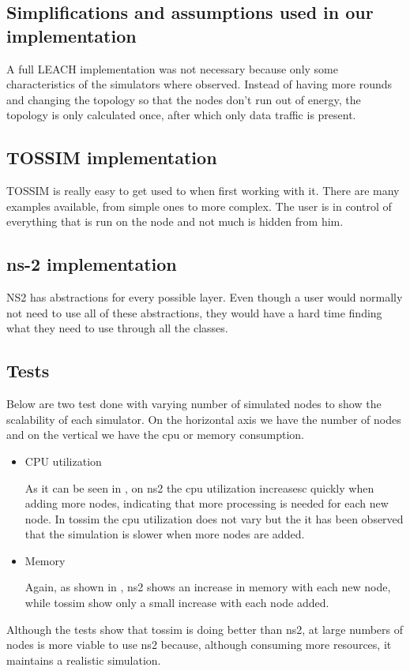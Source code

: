  

\subsection{Simplifications and assumptions used in our implementation}
A full LEACH implementation was not necessary because only some characteristics of
the simulators where observed. Instead of having more rounds and changing the topology
so that the nodes don't run out of energy, the topology is only calculated once, after
which only data traffic is present.
\subsection{TOSSIM implementation}
TOSSIM is really easy to get used to when first working with it. There are many examples
available, from simple ones to more complex. The user is in control of everything that is
run on the node and not much is hidden from him.

\subsection{ns-2 implementation}
NS2 has abstractions for every possible layer. Even though a user would normally not need to use
all of these abstractions, they would have a hard time finding what they need to use through all 
the classes.

\subsection{Tests}
Below are two test done with varying number of simulated nodes to show the scalability of each simulator.
On the horizontal axis we have the number of nodes and on the vertical we have the cpu or memory consumption.
\begin{itemize}
    \item{CPU utilization} 
	
    As it can be seen in , on ns2 the cpu utilization increasesc quickly when adding more nodes, indicating that
	more processing is needed for each new node. In tossim the cpu utilization does not vary
	but the it has been observed that the simulation is slower when more nodes are added.
    \item{Memory}
	
    Again, as shown in , ns2 shows an increase in memory with each new node, while tossim show only a small
	increase with each node added.
\end{itemize}

Although the tests show that tossim is doing better than ns2, at large numbers of nodes is more viable
to use ns2 because, although consuming more resources, it maintains a realistic simulation.
